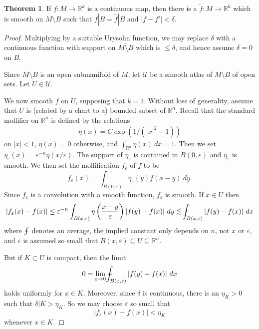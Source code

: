 \documentclass[10pt]{article}
\newcommand{\RR}{\mathbb{R}}
\theoremstyle{definition}
\newtheorem{theorem}[lemma]{Theorem}
\def\Xint#1{\mathchoice
{\XXint\displaystyle\textstyle{#1}}%
{\XXint\textstyle\scriptstyle{#1}}%
{\XXint\scriptstyle\scriptscriptstyle{#1}}%
{\XXint\scriptscriptstyle\scriptscriptstyle{#1}}%
\!\int}
\def\XXint#1#2#3{{\setbox0=\hbox{$#1{#2#3}{\int}$ }
\vcenter{\hbox{$#2#3$ }}\kern-.6\wd0}}
\def\dashint{\Xint-}
\begin{document}
\begin{theorem}
If $f: M \to \RR^k$ is a continuous map, then there is a $\tilde f: M \to \RR^k$ which is smooth on $M \setminus B$ such that $f|B = \tilde f|B$ and $|f - f'| < \delta$.
\end{theorem}
\begin{proof}
Multiplying by a suitable Urysohn function, we may replace $\delta$ with a continuous function with support on $\overline{M \setminus B}$ which is $\leq \delta$, and hence assume $\delta = 0$ on $B$.

Since $M \setminus B$ is an open submanifold of $M$, let $\mathcal U$ be a smooth atlas of $M \setminus B$ of open sets.
Let $U \in \mathcal U$.

We now smooth $f$ on $U$, supposing that $k = 1$. Without loss of generality, assume that $U$ is (related by a chart to a) bounded subset of $\RR^n$.
Recall that the standard mollifier on $\RR^n$ is defined by the relations
$$\eta(x) = C \exp(1/(|x|^2-1))$$
on $|x| < 1$, $\eta(x) = 0$ otherwise, and $\int_{\RR^n} \eta(x)~dx = 1$.
Then we set $\eta_\varepsilon(x) = \varepsilon^{-n} \eta(x/\varepsilon)$.
The support of $\eta_\varepsilon$ is contained in $B(0, \varepsilon)$ and $\eta_\varepsilon$ is smooth.
We then set the mollification $f_\varepsilon$ of $f$ to be
$$f_\varepsilon(x) = \int_{B(0, \varepsilon)} \eta_\varepsilon(y) f(x - y)~dy.$$
Since $f_\varepsilon$ is a convolution with a smooth function, $f_\varepsilon$ is smooth.
If $x \in U$ then
$$|f_\varepsilon(x) - f(x)| \leq \varepsilon^{-n} \int_{B(x, \varepsilon)} \eta\left(\frac{x-y}{\varepsilon}\right) |f(y) - f(x)|~dy \lesssim \dashint_{B(x, \varepsilon)} |f(y) - f(x)|~dx$$
where $\dashint$ denotes an average, the implied constant only depends on $n$, not $x$ or $\varepsilon$, and $\varepsilon$ is assumed so small that $B(x, \varepsilon) \subseteq U \subseteq \RR^n$.

But if $K \subset U$ is compact, then the limit
$$0 = \lim_{\varepsilon \to 0} \dashint_{B(x, \varepsilon)} |f(y) - f(x)|~dx$$
holds uniformly for $x \in K$. Moreover, since $\delta$ is continuous, there is an $\eta_K > 0$ such that $\delta|K > \eta_K$.
So we may choose $\varepsilon$ so small that
$$|f_\varepsilon(x) - f(x)| < \eta_K$$
whenever $x \in K$.


\end{proof}
\end{document}
